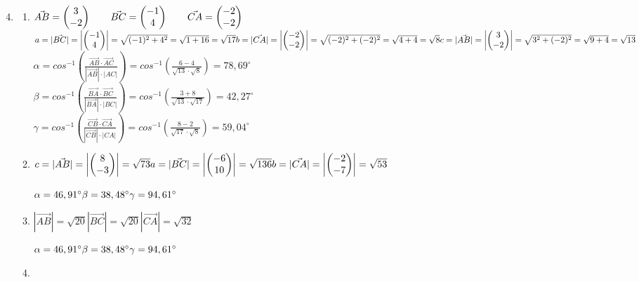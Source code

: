		\begin{enumerate}
		\setcounter{enumi}{3}
		\item 
		\begin{enumerate}
			\item	$\vec{AB}=\begin{pmatrix} 3 \\ -2 \end{pmatrix} \qquad \vec{BC}=\begin{pmatrix} -1 \\ 4 \end{pmatrix} \qquad \vec{CA}=\begin{pmatrix} -2 \\ -2 \end{pmatrix}$
			\bigskip\newline
			$  a=|\vec{BC}| = \left|\begin{pmatrix} -1 \\ 4 \end{pmatrix}\right| = \sqrt{(-1)^2+4^2} = \sqrt{1+16} = \sqrt{17}\\ b=|\vec{CA}|=\left|\begin{pmatrix} -2 \\ -2 \end{pmatrix}\right| = \sqrt{(-2)^2+(-2)^2} = \sqrt{4+4}=\sqrt{8}\\ 
			c=|\vec{AB}| = \left|\begin{pmatrix} 3 \\ -2 \end{pmatrix}\right| = \sqrt{3^2+(-2)^2} = \sqrt{9+4} =\sqrt{13}$\\
			\bigskip\newline
			$ \alpha = cos^{-1} \left(\frac{\vec{AB} \cdot
                            \vec{AC}}{|\vec{AB}|\cdot |AC|}\right)
                        = cos^{-1} \left(\frac{6-4}{\sqrt{13} \cdot \sqrt{8}}\right)
                        = 78,69^\circ $\\
			$ \beta = cos^{-1}
                        \left(\frac{\vec{BA}\cdot\vec{BC}}{|\vec{BA}|\cdot|BC|}\right)
                        =cos^{-1}
                        \left(\frac{3+8}{\sqrt{13}\cdot\sqrt{17}}\right)
                        =42,27^\circ$\\
			$ \gamma = cos^{-1}
                        \left(\frac{\vec{CB}\cdot\vec{CA}}{|\vec{CB}|\cdot|CA|}\right)
                        =cos^{-1} \left(\frac{8-2}{\sqrt{17}\cdot\sqrt{8}}\right) =59,04^\circ $
			
			\item 
			$c= |\vec{AB}|=\left|\begin{pmatrix}  8 \\ -3 \end{pmatrix} \right|=\sqrt{73}\\
			 a= |\vec{BC}|=\left|\begin{pmatrix} -6 \\ 10 \end{pmatrix}\right|=\sqrt{136}\\
			 b= |\vec{CA}|=\left|\begin{pmatrix} -2 \\ -7 \end{pmatrix}\right|=\sqrt{53}$
			 
			$\alpha=46,91^\circ\\
			 \beta=38,48^\circ\\
			 \gamma=94,61^\circ$
			
			\item
			$|\vec{AB}|=\sqrt{20}
			 |\vec{BC}|=\sqrt{20}
			 |\vec{CA}|=\sqrt{32}$
			 
			 $\alpha=46,91^\circ\\
			 \beta=38,48^\circ\\
			 \gamma=94,61^\circ$
			 \item
		\end{enumerate}
		

\end{enumerate}

